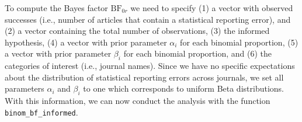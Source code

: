 \documentclass[
  english,
  man,floatsintext]{apa6}
\newenvironment{Shaded}{\begin{snugshade}}{\end{snugshade}}
\newcommand{\CommentTok}[1]{\textcolor[rgb]{0.56,0.35,0.01}{\textit{#1}}}
\newcommand{\DataTypeTok}[1]{\textcolor[rgb]{0.13,0.29,0.53}{#1}}
\newcommand{\DecValTok}[1]{\textcolor[rgb]{0.00,0.00,0.81}{#1}}
\newcommand{\KeywordTok}[1]{\textcolor[rgb]{0.13,0.29,0.53}{\textbf{#1}}}
\newcommand{\NormalTok}[1]{#1}
\newcommand{\OperatorTok}[1]{\textcolor[rgb]{0.81,0.36,0.00}{\textbf{#1}}}
\newcommand{\StringTok}[1]{\textcolor[rgb]{0.31,0.60,0.02}{#1}}
\begin{document}
To compute the Bayes factor \(\text{BF}_{0r}\) we need to specify (1) a vector with observed successes (i.e., number of articles that contain a statistical reporting error), and (2) a vector containing the total number of observations, (3) the informed hypothesis, (4) a vector with prior parameter \(\alpha_i\) for each binomial proportion, (5) a vector with prior parameter \(\beta_i\) for each binomial proportion, and (6) the categories of interest (i.e., journal names). Since we have no specific expectations about the distribution of statistical reporting errors across journals, we set all parameters \(\alpha_i\) and \(\beta_i\) to one which corresponds to uniform Beta distributions. With this information, we can now conduct the analysis with the function \texttt{binom\_bf\_informed}.

\begin{Shaded}
\end{Shaded}
\end{document}
